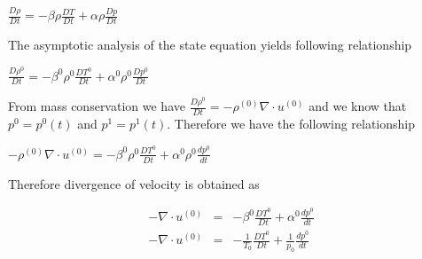 \documentclass[11pt,a4paper]{article}
\begin{document}
$\frac{D \rho}{D t}= -\beta \rho \frac{D T}{D t} + \alpha \rho \frac{D p}{D t}$ 

The asymptotic analysis of the state equation yields following relationship 

$\frac{D \rho^0}{D t}= -\beta^0 \rho^0 \frac{D T^0}{D t} + \alpha^0 \rho^0 \frac{D p^0}{D t}$ 

From mass conservation we have 
$\frac{D \rho^0}{D t} = - \rho^{(0)} \nabla \cdot u^{(0)}$ and we know that $p^0=p^0(t)$ and $p^1=p^1(t)$. Therefore we have the following relationship

$ - \rho^{(0)} \nabla \cdot u^{(0)} = -\beta^0 \rho^0 \frac{D T^0}{D t} + \alpha^0 \rho^0 \frac{d p^0}{d t}$

Therefore divergence of velocity is obtained as 

\begin{eqnarray}
-\nabla \cdot u^{(0)}&=&-\beta^0 \frac{D T^0}{D t} + \alpha^0  \frac{d p^0}{d t} \\
-\nabla \cdot u^{(0)} &=&-\frac{1}{T_0} \frac{D T^0}{D t} + \frac{1}{p_0}  \frac{d p^0}{d t}
\end{eqnarray}
\end{document}
